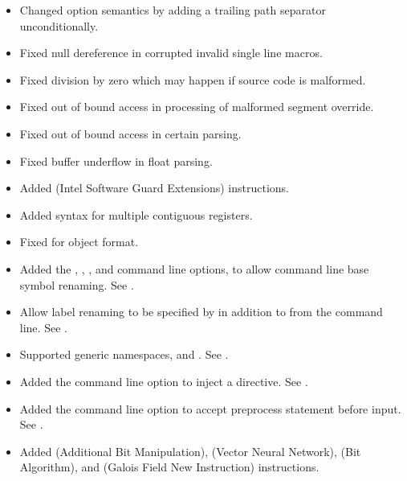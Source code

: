\begin{itemize}
    \item{Changed  option semantics by adding a trailing path
        separator unconditionally.}

    \item{Fixed null dereference in corrupted invalid single line macros.}

    \item{Fixed division by zero which may happen if source code is malformed.}

    \item{Fixed out of bound access in processing of malformed segment override.}

    \item{Fixed out of bound access in certain  parsing.}

    \item{Fixed buffer underflow in float parsing.}

    \item{Added  (Intel Software Guard Extensions) instructions.}

    \item{Added  syntax for multiple contiguous registers.}

    \item{Fixed  for  object format.}

    \item{Added the , , , and
         command line options, to allow command line base symbol
        renaming. See .}

    \item{Allow label renaming to be specified by  in addition to
        from the command line. See .}

    \item{Supported generic  namespaces,  and .
        See .}

    \item{Added the  command line option to inject a 
        directive. See .}

    \item{Added the  command line option to accept preprocess
        statement before input. See .}

    \item{Added   (Additional Bit Manipulation), 
        (Vector Neural Network),  (Bit Algorithm), and  (Galois
        Field New Instruction) instructions.}


\end{itemize}
